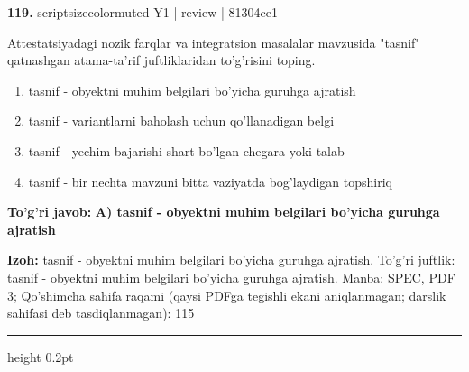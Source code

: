 \documentclass[10pt,a4paper]{article}
\begin{document}
{\bfseries\sffamily\color{ink} 119.} {scriptsizecolor{muted} Y1 | review | 81304ce1}
\par
Attestatsiyadagi nozik farqlar va integratsion masalalar mavzusida "tasnif" qatnashgan atama-ta'rif juftliklaridan to'g'risini toping.
\begin{enumerate}[label=\Alph*),leftmargin=9mm]
\item tasnif - obyektni muhim belgilari bo'yicha guruhga ajratish
\item tasnif - variantlarni baholash uchun qo'llanadigan belgi
\item tasnif - yechim bajarishi shart bo'lgan chegara yoki talab
\item tasnif - bir nechta mavzuni bitta vaziyatda bog'laydigan topshiriq
\end{enumerate}
\begin{tcolorbox}[enhanced,breakable,colback=teal!4,colframe=teal!60!black,boxrule=0.45pt,arc=1.2mm,left=2.7mm,right=2.7mm,top=1.8mm,bottom=1.8mm,before skip=2mm,after skip=2mm]
{\bfseries\sffamily\color{teal}To'g'ri javob:} \textbf{A) tasnif - obyektni muhim belgilari bo'yicha guruhga ajratish}
\par\smallskip
{\bfseries Izoh:} tasnif - obyektni muhim belgilari bo'yicha guruhga ajratish. To'g'ri juftlik: tasnif - obyektni muhim belgilari bo'yicha guruhga ajratish. Manba: SPEC, PDF 3; Qo'shimcha sahifa raqami (qaysi PDFga tegishli ekani aniqlanmagan; darslik sahifasi deb tasdiqlanmagan): 115
\end{tcolorbox}
\vspace{2mm}\hrule height 0.2pt\vspace{3mm}
\end{document}
